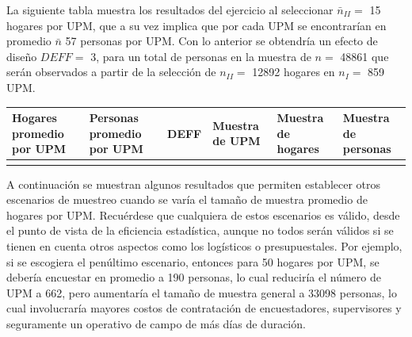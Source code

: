\documentclass[
  12pt,
  spanish,
]{book}
\begin{document}
La siguiente tabla muestra los resultados del ejercicio al seleccionar \(\bar{n}_{II} =\) 15 hogares por UPM, que a su vez implica que por cada UPM se encontrarían en promedio \(\bar{n}\) 57 personas por UPM. Con lo anterior se obtendría un efecto de diseño \(DEFF =\) 3, para un total de personas en la muestra de \(n =\) 48861 que serán observados a partir de la selección de \(n_{II} =\) 12892 hogares en \(n_{I} =\) 859 UPM.

\begin{longtable}[]{@{}
  >{\centering\arraybackslash}p{}
  >{\centering\arraybackslash}p{}
  >{\centering\arraybackslash}p{}
  >{\centering\arraybackslash}p{}
  >{\centering\arraybackslash}p{}
  >{\centering\arraybackslash}p{}@{}}
\toprule
Hogares promedio por UPM & Personas promedio por UPM & DEFF & Muestra de UPM & Muestra de hogares & Muestra de personas \\
\midrule
\endhead
15 & 57 & 3 & 859 & 12892 & 48861 \\
\bottomrule
\end{longtable}

A continuación se muestran algunos resultados que permiten establecer otros escenarios de muestreo cuando se varía el tamaño de muestra promedio de hogares por UPM. Recuérdese que cualquiera de estos escenarios es válido, desde el punto de vista de la eficiencia estadística, aunque no todos serán válidos si se tienen en cuenta otros aspectos como los logísticos o presupuestales. Por ejemplo, si se escogiera el penúltimo escenario, entonces para 50 hogares por UPM, se debería encuestar en promedio a 190 personas, lo cual reduciría el número de UPM a 662, pero aumentaría el tamaño de muestra general a 33098 personas, lo cual involucraría mayores costos de contratación de encuestadores, supervisores y seguramente un operativo de campo de más días de duración.
\end{document}
